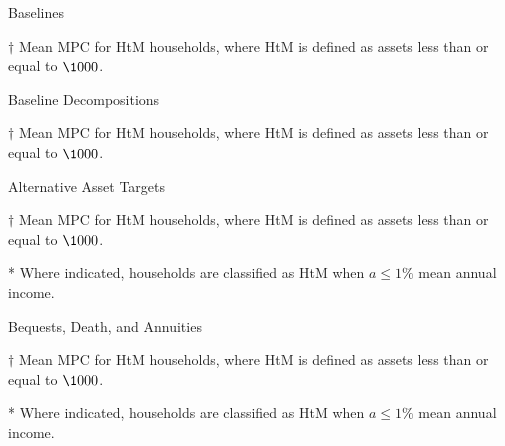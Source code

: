 \documentclass[9pt]{extarticle}
\begin{document}
\begin{table}[h]
\caption{Baselines}
\begin{threeparttable}
\centering


\begin{tablenotes}
	\item[$\dagger$] Mean MPC for HtM households, where HtM is defined as assets less than or equal to $\1000$.
\end{tablenotes}
\end{threeparttable}
\end{table}

\begin{table}[h]
\caption{Baseline Decompositions}
\begin{threeparttable}
\centering


\begin{tablenotes}
	\item[$\dagger$] Mean MPC for HtM households, where HtM is defined as assets less than or equal to $\1000$.
\end{tablenotes}
\end{threeparttable}
\end{table}

\clearpage

\begin{table}[h]
\caption{Alternative Asset Targets}
\begin{threeparttable}
\centering


\begin{tablenotes}
	\item[$\dagger$] Mean MPC for HtM households, where HtM is defined as assets less than or equal to $\1000$.
	\item[*] Where indicated, households are classified as HtM when $a \leq 1\%$ mean annual income.
\end{tablenotes}
\end{threeparttable}
\end{table}

\begin{table}[h]
\caption{Bequests, Death, and Annuities}
\begin{threeparttable}
\centering


\begin{tablenotes}
	\item[$\dagger$] Mean MPC for HtM households, where HtM is defined as assets less than or equal to $\1000$.
	\item[*] Where indicated, households are classified as HtM when $a \leq 1\%$ mean annual income.
\end{tablenotes}
\end{threeparttable}
\end{table}
\end{document}
